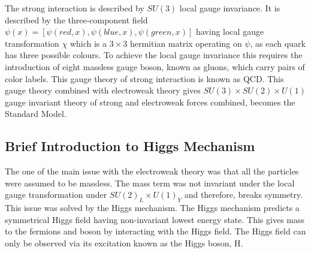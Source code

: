 
The strong interaction is described by $SU(3)$ local gauge invariance. It is described by the three-component field $\psi(x)=[\psi(red,x),\psi(blue,x),\psi(green,x)]$ having local gauge transformation $\chi$ which is a $3\times 3$ hermitian matrix operating on $\psi$, as each quark has three possible colours. To achieve the local gauge invariance this requires the introduction of eight massless gauge boson, known as gluons, which carry pairs of color labels. This gauge theory of strong interaction is known as QCD. This gauge theory combined with electroweak theory gives $SU(3)\times SU(2) \times U(1)$ gauge invariant theory of strong and electroweak forces combined, becomes the Standard Model.






\subsection{Brief Introduction to Higgs Mechanism} %
\label{sub:brief_introduction_to_higgs_mechanism}
The one of the main issue with the electroweak theory was that all the particles were assumed to be massless.
The mass term was not invariant under the local gauge transformation under $SU(2)_L \times U(1)_Y$ and therefore, breaks symmetry.
This issue was solved by the Higgs mechanism.
The Higgs mechanism predicts a symmetrical Higgs field having non-invariant lowest energy state. This gives mass to the fermions and boson by interacting with the Higgs field. The Higgs field can only be observed via its excitation known as the Higgs boson, H.

